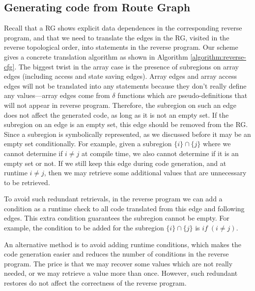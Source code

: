 



\subsection{Generating code from Route Graph}
Recall that a RG shows explicit data dependences in the corresponding reverse program, and that we need to translate the edges in the RG, visited in the reverse topological order, into statements in the reverse program.
Our scheme gives a concrete translation algorithm as shown in Algorithm \ref{algorithm:reverse-cfg}.
The biggest twist in the array case is the presence of subregions on array edges (including access and state saving edges).
Array edges and array access edges will not be translated into any statements because they don't really define any values---array edges come from $\delta$ functions which are pseudo-definitions that will not appear in reverse program.
Therefore, the subregion on such an edge does not affect the generated code, as long as it is not an empty set.
If the subregion on an edge is an empty set, this edge should be removed from the RG.
Since a subregion is symbolically represented, as we discussed before it may be an empty set conditionally.
For example, given a subregion $\{i\}\cap\{j\}$ where we cannot determine if $i\ne j$ at compile time, we also cannot determine if it is an empty set or not.
If we still keep this edge during code generation, and at runtime $i\ne j$, then we may retrieve some additional values that are unnecessary to be retrieved.

To avoid such redundant retrievals, in the reverse program we can add a condition as a runtime check to all code translated from this edge and following edges. 
This extra condition guarantees the subregion cannot be empty.
For example, the condition to be added for the subregion $\{i\}\cap\{j\}$ is $if\;(i\ne j)$.

An alternative method is to avoid adding runtime conditions, which makes the code generation easier and reduces the number of conditions in the reverse program.
The price is that we may recover some values which are not really needed, or we may retrieve a value more than once.
However, such redundant restores do not affect the correctness of the reverse program.


